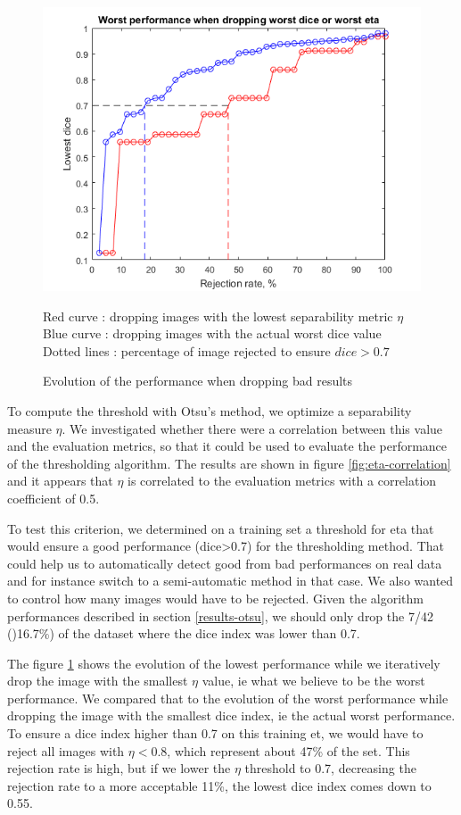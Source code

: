 \documentclass[a4paper,10pt]{article}
\begin{document}
\begin{figure}[h]
	\centering
	\includegraphics[width=0.6\linewidth]{../results/selection-criterion/eta-dice-drop}
	\caption{Evolution of the performance when dropping bad results}{Red curve :  dropping images with the lowest separability metric $\eta$\\ Blue curve : dropping images with the actual worst dice value \\ Dotted lines : percentage of image rejected to ensure $dice > 0.7$}
	\label{fig:eta-dice-drop}
\end{figure}

To compute the threshold with Otsu's method, we optimize a separability measure $\eta$. We investigated whether there were a correlation between this value and the evaluation metrics, so that it could be used to evaluate the performance of the thresholding algorithm. The results are shown in figure \ref{fig:eta-correlation} and it appears that $\eta$ is correlated to the evaluation metrics with a correlation coefficient of 0.5.

To test this criterion, we determined on a training set a threshold for eta that would ensure a good performance (dice>0.7) for the thresholding method. That could help us to automatically detect good from bad performances on real data and for instance switch to a semi-automatic method in that case. We also wanted to control how many images would have to be rejected. Given the algorithm performances described in section \ref{results-otsu}, we should only drop the 7/42 ()16.7\%) of the dataset where the dice index was lower than 0.7.  

The figure \ref{fig:eta-dice-drop} shows the evolution of the lowest performance while we iteratively drop the image with the smallest $\eta$ value, ie what we believe to be the worst performance. We compared that to the evolution of the worst performance while dropping the image with the smallest dice index, ie the actual worst performance. To ensure a dice index higher than 0.7 on this training et, we would have to reject all images with $\eta < 0.8$, which represent about 47\% of the set. This rejection rate is high, but if we lower the $\eta$ threshold to 0.7, decreasing the rejection rate to a more acceptable 11\%, the lowest dice index comes down to 0.55. 
\end{document}

